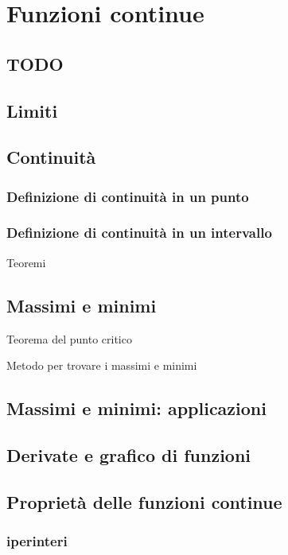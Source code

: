 
\chapter{Funzioni continue}

\section{TODO}

\section{Limiti}
\label{sec:cont_limiti}

\section{Continuità}
\label{sec:cont_continuita}

\subsection{Definizione di continuità in un punto}
\label{subsec:cont_definizione}

\subsection{Definizione di continuità in un intervallo}
\label{subsec:cont_definizione}

Teoremi

\section{Massimi e minimi}
\label{sec:cont_massimiminimi}

Teorema del punto critico

Metodo per trovare i massimi e minimi

\section{Massimi e minimi: applicazioni}
\label{sec:cont_applicazioni}

\section{Derivate e grafico di funzioni}
\label{sec:cont_derivate_studiof}

\section{Proprietà delle funzioni continue}
\label{sec:cont_proprieta}

\subsection{iperinteri}
\label{subsec:cont_iperinteri}

